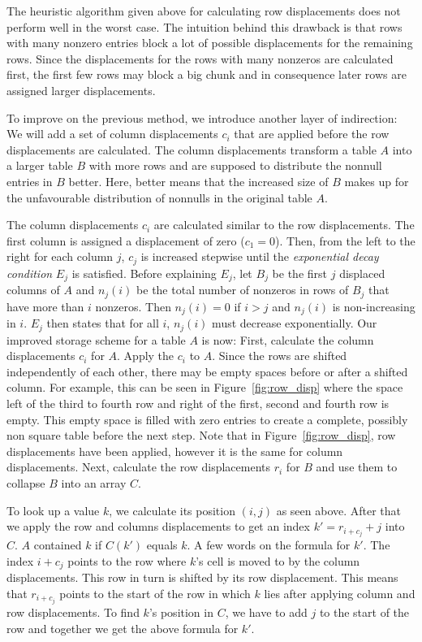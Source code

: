 The heuristic algorithm given above for calculating row displacements does not perform well in the worst case.
The intuition behind this drawback is that rows with many nonzero entries block a lot of possible displacements for the remaining rows.
Since the displacements for the rows with many nonzeros are calculated first, the first few rows may block a big chunk and in consequence later rows are assigned larger displacements.

To improve on the previous method, we introduce another layer of indirection:
We will add a set of column displacements $c_i$ that are applied before the row displacements are calculated.
The column displacements transform a table $A$ into a larger table $B$ with more rows and are supposed to distribute the nonnull entries in $B$ better.
Here, better means that the increased size of $B$ makes up for the unfavourable distribution of nonnulls in the original table $A$.

The column displacements $c_i$ are calculated similar to the row displacements.
The first column is assigned a displacement of zero ($c_1 = 0$).
Then, from the left to the right for each column $j$, $c_j$ is increased stepwise until the \emph{exponential decay condition} $E_j$ is satisfied.
Before explaining $E_j$, let $B_j$ be the first $j$ displaced columns of $A$ and $n_j(i)$ be the total number of nonzeros in rows of $B_j$ that have more than $i$ nonzeros.
Then $n_j(i) = 0$ if $i > j$ and $n_j(i)$ is non-increasing in $i$.
$E_j$ then states that for all $i$, $n_j(i)$ must decrease exponentially.
Our improved storage scheme for a table $A$ is now:
First, calculate the column displacements $c_i$ for $A$.
Apply the $c_i$ to $A$.
Since the rows are shifted independently of each other, there may be empty spaces before or after a shifted column.
For example, this can be seen in Figure~\ref{fig:row_disp} where the space left of the third to fourth row and right of the first, second and fourth row is empty.
This empty space is filled with zero entries to create a complete, possibly non square table before the next step.
Note that in Figure~\ref{fig:row_disp}, row displacements have been applied, however it is the same for column displacements.
Next, calculate the row displacements $r_i$ for $B$ and use them to collapse $B$ into an array $C$.

To look up a value $k$, we calculate its position $(i, j)$ as seen above.
After that we apply the row and columns displacements to get an index $k' = r_{i + c_j} + j$ into $C$.
$A$ contained $k$ if $C(k')$ equals $k$.
A few words on the formula for $k'$.
The index $i + c_j$ points to the row where $k$'s cell is moved to by the column displacements.
This row in turn is shifted by its row displacement.
This means that $r_{i + c_j}$ points to the start of the row in which $k$ lies after applying column and row displacements.
To find $k$'s position in $C$, we have to add $j$ to the start of the row and together we get the above formula for $k'$.
